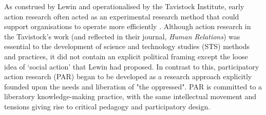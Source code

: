 
As construed by Lewin and operationalised by the Tavistock Institute, early action research often acted as an experimental research method that could support organisations to operate more efficiently \citep{neumann_kurt_2005}. Although action research in the Tavistock's work (and reflected in their journal, \textit{Human Relations}) was essential to the development of science and technology studies (STS) methods and practices, it did not contain an explicit political framing except the loose idea of `social action' that Lewin had proposed. In contrast to this, participatory action research (PAR) began to be developed as a research approach explicitly founded upon the needs and liberation of "the oppressed". PAR is committed to a liberatory knowledge-making practice\citep{reason_handbook_2006}, with the same intellectual movement and tensions giving rise to critical pedagogy and participatory design.

